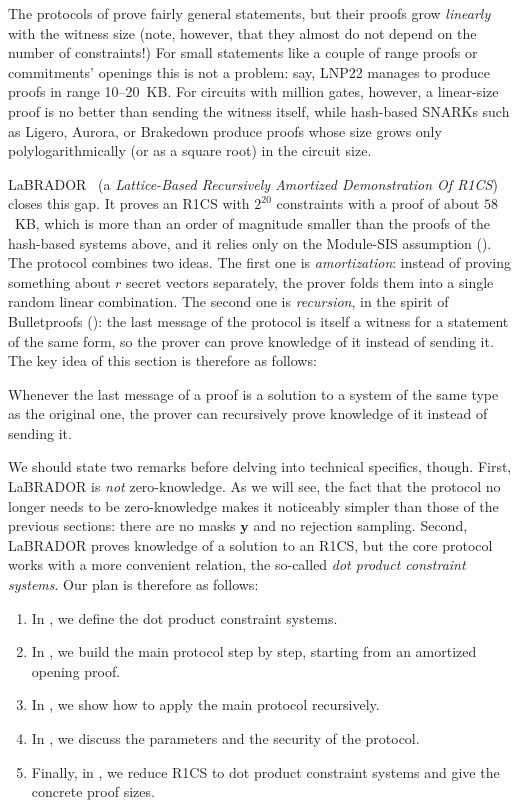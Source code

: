 \documentclass[../../book.tex]{subfiles}
\begin{document}
The protocols of  prove fairly general statements, but their proofs grow \emph{linearly} with the witness size (note, however, that they almost do not depend on the number of constraints!)
For small statements like a couple of range proofs or commitments' openings this is not a problem: say, LNP22 manages to produce proofs in range 10--20~KB.
For circuits with million gates, however, a linear-size proof is no better than sending the witness itself, while hash-based SNARKs such as Ligero, Aurora, or Brakedown produce proofs whose size grows only polylogarithmically (or as a square root) in the circuit size.

LaBRADOR~\cite{C:BeuSei23} (a \emph{Lattice-Based Recursively Amortized Demonstration Of R1CS}) closes this gap.
It proves an R1CS with $2^{20}$ constraints with a proof of about $58$~KB, which is more than an order of magnitude smaller than the proofs of the hash-based systems above, and it relies only on the Module-SIS assumption ().
The protocol combines two ideas.
The first one is \emph{amortization}: instead of proving something about $r$ secret vectors separately, the prover folds them into a single random linear combination.
The second one is \emph{recursion}, in the spirit of Bulletproofs (): the last message of the protocol is itself a witness for a statement of the same form, so the prover can prove knowledge of it instead of sending it.
The key idea of this section is therefore as follows:

\begin{bookquote}
    Whenever the last message of a proof is a solution to a system of the same type as the original one, the prover can recursively prove knowledge of it instead of sending it.
\end{bookquote}

We should state two remarks before delving into technical specifics, though.
First, LaBRADOR is \emph{not} zero-knowledge.
As we will see, the fact that the protocol no longer needs to be zero-knowledge makes it noticeably simpler than those of the previous sections: there are no masks $\mathbf{y}$ and no rejection sampling.
Second, LaBRADOR proves knowledge of a solution to an R1CS, but the core protocol works with a more convenient relation, the so-called \emph{dot product constraint systems}.
Our plan is therefore as follows:
\begin{enumerate}
    \item In , we define the dot product constraint systems.
    \item In , we build the main protocol step by step, starting from an amortized opening proof.
    \item In , we show how to apply the main protocol recursively.
    \item In , we discuss the parameters and the security of the protocol.
    \item Finally, in , we reduce R1CS to dot product constraint systems and give the concrete proof sizes.
\end{enumerate}
\end{document}
